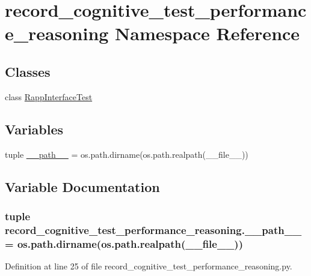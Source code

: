 \hypertarget{namespacerecord__cognitive__test__performance__reasoning}{\section{record\-\_\-cognitive\-\_\-test\-\_\-performance\-\_\-reasoning Namespace Reference}
\label{namespacerecord__cognitive__test__performance__reasoning}
}
\subsection*{Classes}
\begin{DoxyCompactItemize}
\item 
class \hyperlink{classrecord__cognitive__test__performance__reasoning_1_1RappInterfaceTest}{Rapp\-Interface\-Test}
\end{DoxyCompactItemize}
\subsection*{Variables}
\begin{DoxyCompactItemize}
\item 
tuple \hyperlink{namespacerecord__cognitive__test__performance__reasoning_a2371da64392ee4c515e0b732ba94994c}{\-\_\-\-\_\-path\-\_\-\-\_\-} = os.\-path.\-dirname(os.\-path.\-realpath(\-\_\-\-\_\-file\-\_\-\-\_\-))
\end{DoxyCompactItemize}


\subsection{Variable Documentation}
\hypertarget{namespacerecord__cognitive__test__performance__reasoning_a2371da64392ee4c515e0b732ba94994c}{
\subsubsection[{\-\_\-\-\_\-path\-\_\-\-\_\-}]{\setlength{\rightskip}{0pt plus 5cm}tuple record\-\_\-cognitive\-\_\-test\-\_\-performance\-\_\-reasoning.\-\_\-\-\_\-path\-\_\-\-\_\- = os.\-path.\-dirname(os.\-path.\-realpath(\-\_\-\-\_\-file\-\_\-\-\_\-))}}\label{namespacerecord__cognitive__test__performance__reasoning_a2371da64392ee4c515e0b732ba94994c}


Definition at line 25 of file record\-\_\-cognitive\-\_\-test\-\_\-performance\-\_\-reasoning.\-py.

